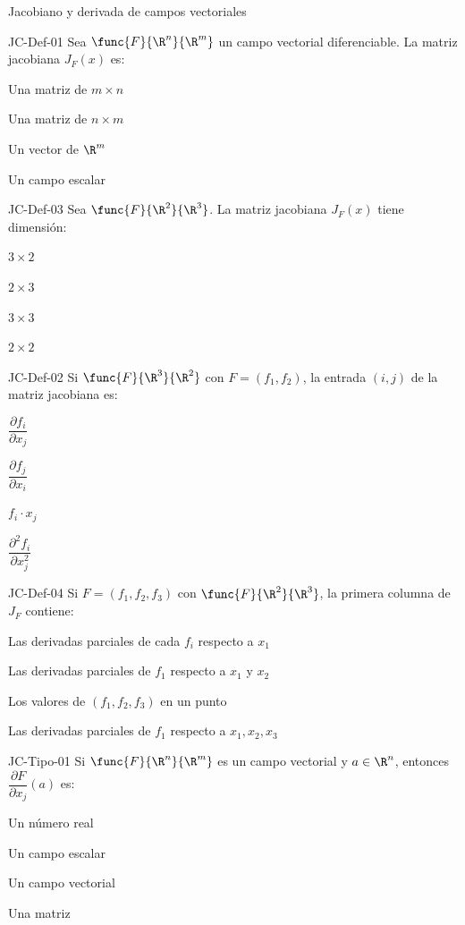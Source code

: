 \documentclass[a4,11pt]{aleph-notas}
\begin{document}
\begin{quiz}{Jacobiano y derivada de campos vectoriales}

\begin{multi}[]%
    {JC-Def-01}
    Sea $\func{F}{\R^n}{\R^m}$ un campo vectorial diferenciable. La matriz jacobiana $J_F({x})$ es:
    \item* Una matriz de $m\times n$
    \item Una matriz de $n\times m$
    \item Un vector de $\R^m$
    \item Un campo escalar
\end{multi}

\begin{multi}[]%
    {JC-Def-03}
    Sea $\func{F}{\R^2}{\R^3}$. La matriz jacobiana $J_F({x})$ tiene dimensión:
    \item* $3\times 2$
    \item $2\times 3$
    \item $3\times 3$
    \item $2\times 2$
\end{multi}

\begin{multi}[]%
    {JC-Def-02}
    Si $\func{F}{\R^3}{\R^2}$ con $F=(f_1, f_2)$, la entrada $(i,j)$ de la matriz jacobiana es:
    \item* $\dfrac{\partial f_i}{\partial x_j}$
    \item $\dfrac{\partial f_j}{\partial x_i}$
    \item $f_i \cdot x_j$
    \item $\dfrac{\partial^2 f_i}{\partial x_j^2}$
\end{multi}

\begin{multi}[]%
    {JC-Def-04}
    Si $F = (f_1, f_2, f_3)$ con $\func{F}{\R^2}{\R^3}$, la primera columna de $J_F$ contiene:
    \item* Las derivadas parciales de cada $f_i$ respecto a $x_1$
    \item Las derivadas parciales de $f_1$ respecto a $x_1$ y $x_2$
    \item Los valores de $(f_1, f_2, f_3)$ en un punto
    \item Las derivadas parciales de $f_1$ respecto a $x_1, x_2, x_3$
\end{multi}

\begin{multi}[]%
    {JC-Tipo-01}
    Si $\func{F}{\R^n}{\R^m}$ es un campo vectorial y ${a}\in\R^n$, entonces $\dfrac{\partial F}{\partial x_j}({a})$ es:
    \item Un número real
    \item Un campo escalar
    \item* Un campo vectorial
    \item Una matriz
\end{multi}


\end{quiz}
\end{document}
